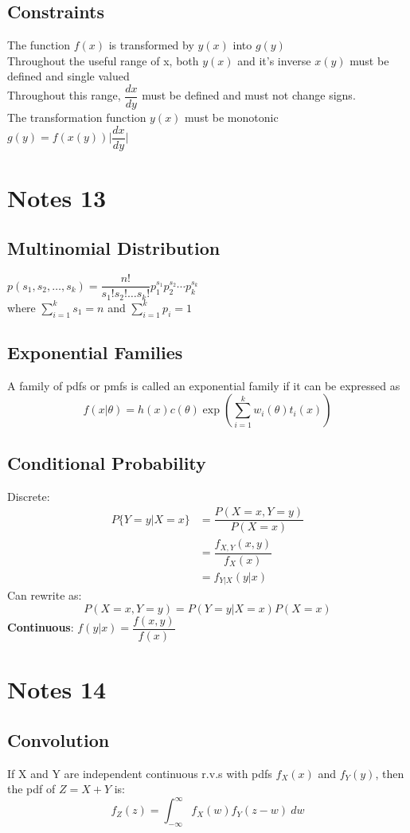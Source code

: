 \documentclass[openany]{book}
\begin{document}
\begin{flushleft}
\section{Constraints}
The function $f(x)$ is transformed by $y(x)$ into $g(y)$\\
Throughout the useful range of x, both $y(x)$ and it's inverse $x(y)$ must be defined and single valued\\
Throughout this range, $\dfrac{dx}{dy}$ must be defined and must not change signs.\\
The transformation function $y(x)$ must be monotonic\\
$g(y)=f(x(y))\bigg|\dfrac{dx}{dy}\bigg |$\\
\chapter{Notes 13}
\section{Multinomial Distribution}
$p(s_1,s_2,\dots,s_k)=\dfrac{n!}{s_1!s_2!\dots s_k!}p_1^{s_1}p_2^{s_2}\cdots p_k^{s_k}$\\
where $\sum_{i=1}^{k}s_1=n$ and $\sum_{i=1}^{k}p_i=1$
\section{Exponential Families}
A family of pdfs or pmfs is called an exponential family if it can be expressed as
\[f(x|\theta)=h(x)c(\theta)\exp\left(\sum_{i=1}^{k}w_i(\theta)t_i(x)\right)
\]

\section{Conditional Probability}
Discrete:\\
\begin{align*}
P\{Y=y|X=x \}&=\dfrac{P(X=x,Y=y)}{P(X=x)}\\
&=\dfrac{f_{X,Y}(x,y)}{f_X(x)}\\
&=f_{Y|X}(y|x)
\end{align*}
Can rewrite as:\\
\[P(X=x,Y=y)=P(Y=y|X=x)P(X=x)
\]
\textbf{Continuous}: $f(y|x)=\dfrac{f(x,y)}{f(x)}$

\chapter{Notes 14}
\section{Convolution}
If X and Y are independent continuous r.v.s with pdfs $f_X(x)$ and $f_Y(y)$, then the pdf of $Z=X+Y$ is:
\[f_Z(z)=\int_{-\infty}^{\infty}f_X(w)f_Y(z-w)\ dw
\]

\end{flushleft}
\end{document}
